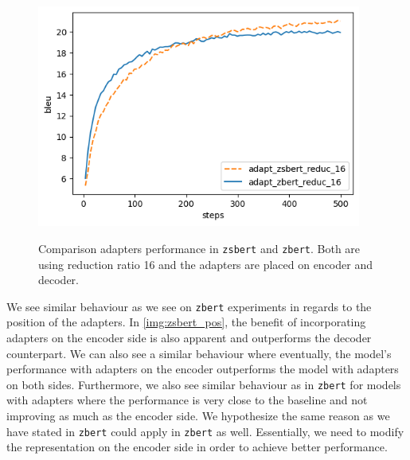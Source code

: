 \begin{figure}[h]
    {\includegraphics[width=0.95\textwidth]{img/zbert_vs_zsbert.png}}
    \centering
    \caption{Comparison adapters performance in \texttt{zsbert} and \texttt{zbert}. Both are using reduction ratio 16 and the adapters are placed on encoder and decoder.}
    \label{img:zbert_vs_zsbert}
\end{figure}

We see similar behaviour as we see on \texttt{zbert} experiments in regards to the position of the adapters. In \cref{img:zsbert_pos}, the benefit of incorporating adapters on the encoder side is also apparent and outperforms the decoder counterpart. We can also see a similar behaviour where eventually, the model's performance with adapters on the encoder outperforms the model with adapters on both sides. Furthermore, we also see similar behaviour as in \texttt{zbert} for models with adapters where the performance is very close to the baseline and not improving as much as the encoder side. We hypothesize the same reason as we have stated in \texttt{zbert} could apply in \texttt{zbert} as well. Essentially, we need to modify the representation on the encoder side in order to achieve better performance.
